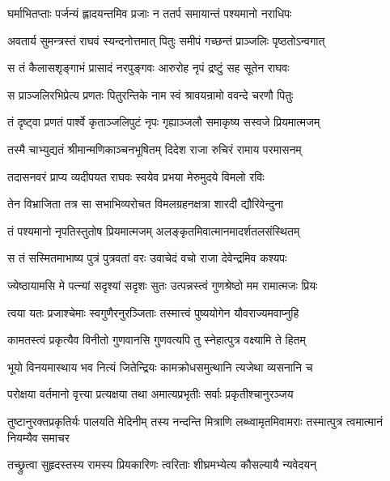 \twolineshloka
{घर्माभितप्ताः पर्जन्यं ह्लादयन्तमिव प्रजाः}
{न ततर्प समायान्तं पश्यमानो नराधिपः} %

\twolineshloka
{अवतार्य सुमन्त्रस्तं राघवं स्यन्दनोत्तमात्}
{पितुः समीपं गच्छन्तं प्राञ्जलिः पृष्ठतोऽन्वगात्} %

\twolineshloka
{स तं कैलासशृङ्गाभं प्रासादं नरपुङ्गवः}
{आरुरोह नृपं द्रष्टुं सह सूतेन राघवः} %

\twolineshloka
{स प्राञ्जलिरभिप्रेत्य प्रणतः पितुरन्तिके}
{नाम स्वं श्रावयन्रामो ववन्दे चरणौ पितुः} %

\twolineshloka
{तं दृष्ट्वा प्रणतं पार्श्वे कृताञ्जलिपुटं नृपः}
{गृह्याञ्जलौ समाकृष्य सस्वजे प्रियमात्मजम्} %

\twolineshloka
{तस्मै चाभ्युद्यतं श्रीमान्मणिकाञ्चनभूषितम्}
{दिदेश राजा रुचिरं रामाय परमासनम्} %

\twolineshloka
{तदासनवरं प्राप्य व्यदीपयत राघवः}
{स्वयेव प्रभया मेरुमुदये विमलो रविः} %

\twolineshloka
{तेन विभ्राजिता तत्र सा सभाभिव्यरोचत}
{विमलग्रहनक्षत्रा शारदी द्यौरिवेन्दुना} %

\twolineshloka
{तं पश्यमानो नृपतिस्तुतोष प्रियमात्मजम्}
{अलङ्कृतमिवात्मानमादर्शतलसंस्थितम्} %

\twolineshloka
{स तं सस्मितमाभाष्य पुत्रं पुत्रवतां वरः}
{उवाचेदं वचो राजा देवेन्द्रमिव कश्यपः} %

\twolineshloka
{ज्येष्ठायामसि मे पत्न्यां सदृश्यां सदृशः सुतः}
{उत्पन्नस्त्वं गुणश्रेष्ठो मम रामात्मजः प्रियः} %

\twolineshloka
{त्वया यतः प्रजाश्चेमाः स्वगुणैरनुरञ्जिताः}
{तस्मात्त्वं पुष्ययोगेन यौवराज्यमवाप्नुहि} %

\twolineshloka
{कामतस्त्वं प्रकृत्यैव विनीतो गुणवानसि}
{गुणवत्यपि तु स्नेहात्पुत्र वक्ष्यामि ते हितम्} %

\twolineshloka
{भूयो विनयमास्थाय भव नित्यं जितेन्द्रियः}
{कामक्रोधसमुत्थानि त्यजेथा व्यसनानि च} %

\twolineshloka
{परोक्षया वर्तमानो वृत्त्या प्रत्यक्षया तथा}
{अमात्यप्रभृतीः सर्वाः प्रकृतीश्चानुरञ्जय} %

\threelineshloka
{तुष्टानुरक्तप्रकृतिर्यः पालयति मेदिनीम्}
{तस्य नन्दन्ति मित्राणि लब्ध्वामृतमिवामराः}
{तस्मात्पुत्र त्वमात्मानं नियम्यैव समाचर} %

\twolineshloka
{तच्छ्रुत्वा सुहृदस्तस्य रामस्य प्रियकारिणः}
{त्वरिताः शीघ्रमभ्येत्य कौसल्यायै न्यवेदयन्} %

